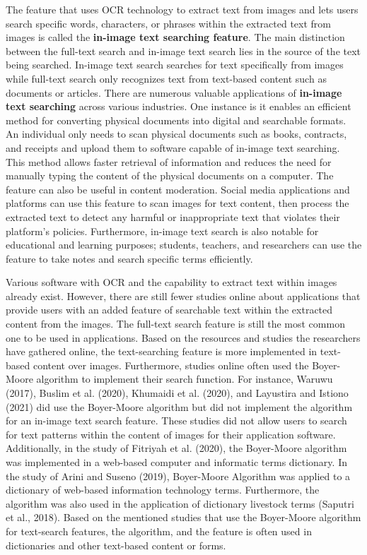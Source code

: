 \hfill

The feature that uses OCR technology to extract text from images and lets users search specific
words, characters, or phrases within the extracted text from images is called the \textbf{in-image
text searching feature}. The main distinction between the full-text search and in-image text search
lies in the source of the text being searched. In-image text search searches for text specifically
from images while full-text search only recognizes text from text-based content such as documents or
articles. There are numerous valuable applications of \textbf{in-image text searching} across
various industries. One instance is it enables an efficient method for converting physical documents
into digital and searchable formats. An individual only needs to scan physical documents such as
books, contracts, and receipts and upload them to software capable of in-image text searching. This
method allows faster retrieval of information and reduces the need for manually typing the content
of the physical documents on a computer. The feature can also be useful in content moderation.
Social media applications and platforms can use this feature to scan images for text content, then
process the extracted text to detect any harmful or inappropriate text that violates their
platform’s policies. Furthermore, in-image text search is also notable for educational and learning
purposes; students, teachers, and researchers can use the feature to take notes and search specific
terms efficiently.

\hfill

Various software with OCR and the capability to extract text within images already exist. However,
there are still fewer studies online about applications that provide users with an added feature of
searchable text within the extracted content from the images. The full-text search feature is still
the most common one to be used in applications. Based on the resources and studies the researchers
have gathered online, the text-searching feature is more implemented in text-based content over
images. Furthermore, studies online often used the Boyer-Moore algorithm to implement their search
function. For instance, Waruwu (2017), Buslim et al. (2020), Khumaidi et al. (2020), and Layustira
and Istiono (2021) did use the Boyer-Moore algorithm but did not implement the algorithm for an
in-image text search feature. These studies did not allow users to search for text patterns within
the content of images for their application software. Additionally, in the study of Fitriyah et al.
(2020), the Boyer-Moore algorithm was implemented in a web-based computer and informatic terms
dictionary. In the study of Arini and Suseno (2019), Boyer-Moore Algorithm was applied to a
dictionary of web-based information technology terms. Furthermore, the algorithm was also used in
the application of dictionary livestock terms (Saputri et al., 2018). Based on the mentioned studies
that use the Boyer-Moore algorithm for text-search features, the algorithm, and the feature is often
used in dictionaries and other text-based content or forms.

